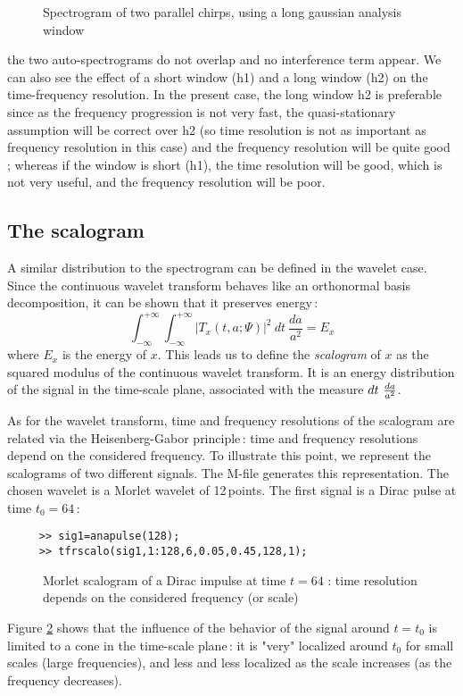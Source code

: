\begin{itemize}
\begin{figure}[htb]
\epsfxsize=10cm
\epsfysize=8cm
\centerline{}
\caption{\label{At4fig4}Spectrogram of two parallel chirps, using a long
gaussian analysis window}
\end{figure}
the two auto-spectrograms do not overlap and no interference term
appear. We can also see the effect of a short window ({\ttfamily h1}) and a
long window ({\ttfamily h2}) on the time-frequency resolution. In the
present case, the long window {\ttfamily h2} is preferable since as the
frequency progression is not very fast, the quasi-stationary assumption
will be correct over {\ttfamily h2} (so time resolution is not as important
as frequency resolution in this case) and the frequency resolution will be
quite good ; whereas if the window is short ({\ttfamily h1}), the time
resolution will be good, which is not very useful, and the frequency
resolution will be poor.
\end{itemize}

\subsection{The scalogram}
\label{SCALO}
  A similar distribution to the spectrogram can be defined in the wavelet
case. Since the continuous wavelet transform behaves like an orthonormal
basis decomposition, it can be shown that it preserves energy\,:
\[\int_{-\infty}^{+\infty} \int_{-\infty}^{+\infty} |T_x(t,a;\Psi)|^2\ dt\
 \frac{da}{a^2} = E_x\] where $E_x$ is the energy of $x$. This leads us to
define the {\it scalogram} of $x$ as the squared modulus of the continuous
wavelet transform. It is an energy distribution of the signal in the
time-scale plane, associated with the measure $dt\ {da\over a^2}$.

  As for the wavelet transform, time and frequency resolutions of the
scalogram are related via the Heisenberg-Gabor principle\,: time and
frequency resolutions depend on the considered frequency. To illustrate
this point, we represent the scalograms of two different signals. The
M-file \index{\ttfamily tfrscalo}{\ttfamily tfrscalo.m} generates this
representation. The chosen wavelet is a Morlet wavelet of 12\,points. The
first signal is a Dirac pulse at time $t_0=64$\,:
\begin{verbatim}
     >> sig1=anapulse(128);
     >> tfrscalo(sig1,1:128,6,0.05,0.45,128,1);
\end{verbatim}
\begin{figure}[htb]
\epsfxsize=10cm
\epsfysize=8cm
\centerline{}
\caption{\label{At4fig5}Morlet scalogram of a Dirac impulse at time $t=64$
: time resolution depends on the considered frequency (or scale)}
\end{figure}
Figure \ref{At4fig5} shows that the influence of the behavior of the signal
around $t=t_0$ is limited to a cone in the time-scale plane\,: it is "very"
localized around $t_0$ for small scales (large frequencies), and less and
less localized as the scale increases (as the frequency decreases).

